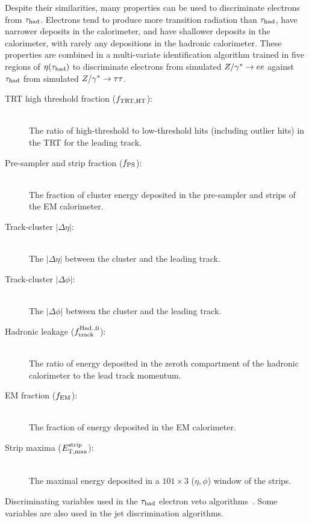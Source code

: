 Despite their similarities, many properties can be used to discriminate electrons from $\tau_\text{had}$. Electrons tend to produce more transition radiation than $\tau_\text{had}$, have narrower deposits in the calorimeter, and have shallower deposits in the calorimeter, with rarely any depositions in the hadronic calorimeter. These properties are combined in a multi-variate identification algorithm trained in five regions of $\eta(\tauh)$ to discriminate electrons from simulated $Z/\gamma^\ast \rightarrow ee$ against $\tau_\text{had}$ from simulated $Z/\gamma^\ast \rightarrow \tau\tau$.
%
\begin{description}
    \item[TRT high threshold fraction ($f_\mathrm{TRT,HT}$):] \hfill \\
      The ratio of high-threshold to low-threshold hits (including outlier hits) in the TRT for the leading track.
    \item[Pre-sampler and strip fraction ($f_\mathrm{PS}$):] \hfill \\
      The fraction of cluster energy deposited in the pre-sampler and strips of the EM calorimeter.
    \item[Track-cluster $|\Delta\eta|$:] \hfill \\
      The $|\Delta\eta|$ between the cluster and the leading track.
    \item[Track-cluster $|\Delta\phi|$:] \hfill \\
      The $|\Delta\phi|$ between the cluster and the leading track.
    \item[Hadronic leakage ($f^\mathrm{Had.,0}_{\mathrm{track}}$):] \hfill \\
      The ratio of energy deposited in the zeroth compartment of the hadronic calorimeter to the lead track momentum.
    \item[EM fraction ($f_\mathrm{EM}$):] \hfill \\
      The fraction of energy deposited in the EM calorimeter.
    \item[Strip maxima ($E_\mathrm{T,max}^\mathrm{strip}$):] \hfill \\
      The maximal energy deposited in a $101 \!\times\! 3$ ($\eta, \phi$) window of the strips.
\end{description}
%
\begin{table}[bp] 
  \centering
  \renewcommand{\arraystretch}{1.4}
  \caption{Discriminating variables used in the $\tau_\text{had}$ electron veto algorithms~\cite{PERF-2013-06,ATLAS-CONF-2013-064,ATLAS-CONF-2012-142}. Some variables are also used in the jet discrimination algorithms.}
  
  \label{tab:taus-evetovars}
\end{table}

